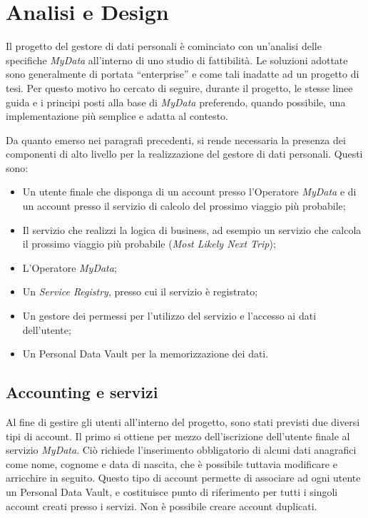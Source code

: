 \chapter{Analisi e Design}
\label{capitolo4}
\thispagestyle{empty}

\noindent Il progetto del gestore di dati personali \`e cominciato con un’analisi delle specifiche \textit{MyData} all’interno di uno studio di fattibilit\`a. Le soluzioni adottate sono generalmente di portata “enterprise” e come tali inadatte ad un progetto di tesi. Per questo motivo ho cercato di seguire, durante il progetto, le stesse linee guida e i principi posti alla base di \textit{MyData} preferendo, quando possibile, una implementazione pi\`u semplice e adatta al contesto.

Da quanto emerso nei paragrafi precedenti, si rende necessaria la presenza dei componenti di alto livello per la realizzazione del gestore di dati personali. Questi sono:
\begin{itemize}
	\item Un utente finale che disponga di un account presso l’Operatore \textit{MyData} e di un account presso il servizio di calcolo del prossimo viaggio pi\`u probabile;
	\item Il servizio che realizzi la logica di business, ad esempio un servizio che calcola il prossimo viaggio pi\`u probabile (\textit{Most Likely Next Trip});
	\item L’Operatore \textit{MyData};
	\item Un \textit{Service Registry}, presso cui il servizio \`e registrato;
	\item Un gestore dei permessi per l’utilizzo del servizio e l’accesso ai dati dell’utente;
	\item Un Personal Data Vault per la memorizzazione dei dati.
\end{itemize}

\section{Accounting e servizi}
\cite{githubmydataaccount}

Al fine di gestire gli utenti all’interno del progetto, sono stati previsti due diversi tipi di account. Il primo si ottiene per mezzo dell’iscrizione dell’utente finale al servizio \textit{MyData}. Ci\`o richiede l’inserimento obbligatorio di alcuni dati anagrafici come nome, cognome e data di nascita, che \`e possibile tuttavia modificare e arricchire in seguito. Questo tipo di account permette di associare ad ogni utente un Personal Data Vault, e costituisce punto di riferimento per tutti i singoli account creati presso i servizi. Non \`e possibile creare account duplicati.

